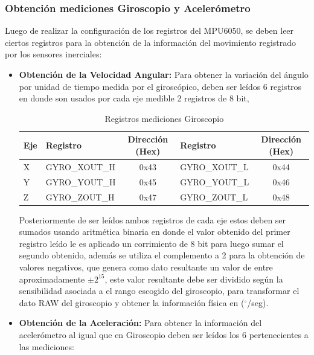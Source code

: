 \documentclass[12pt,a4paper]{article}
\newcommand{\grad}{$^{\circ}$}
\begin{document}
\subsubsection{Obtención mediciones Giroscopio y Acelerómetro}
Luego de realizar la configuración de los registros del MPU6050, se deben leer ciertos registros para la obtención de la información del movimiento registrado por los sensores inerciales:

\begin{itemize}
	\item \textbf{Obtención de la Velocidad Angular:} Para obtener la variación del ángulo por unidad de tiempo medida por el giroscópico, deben ser leídos 6 registros en donde son usados por cada eje medible 2 registros de 8 bit,
	
	\begin{table}[H]
		\centering
		\label{table:registrosgyro}
		\begin{tabular}{|l|l|c|l|c|}
			\hline
			\textbf{Eje} & \textbf{Registro} & \textbf{Dirección (Hex)} & \textbf{Registro} & \textbf{Dirección (Hex)} \\ \hline
			X            & GYRO\_XOUT\_H     & 0x43                     & GYRO\_XOUT\_L     & 0x44                     \\ \hline
			Y            & GYRO\_YOUT\_H     & 0x45                     & GYRO\_YOUT\_L     & 0x46                     \\ \hline
			Z            & GYRO\_ZOUT\_H     & 0x47                     & GYRO\_ZOUT\_L     & 0x48                     \\ \hline
		\end{tabular}
		\caption{Registros mediciones Giroscopio}					
	\end{table}
	
	Posteriormente de ser leídos ambos registros de cada eje estos deben ser sumados usando aritmética binaria en donde el valor obtenido del primer registro leído le es aplicado un corrimiento de 8 bit para luego sumar el segundo obtenido, además se utiliza el complemento a 2 para la obtención de valores negativos, que genera como dato resultante un valor de entre aproximadamente $\pm 2^{15}$, este valor resultante debe ser dividido según la sensibilidad asociada a el rango escogido del giroscopio, para transformar el dato RAW del giroscopio y obtener la información física en (\grad/seg).
	
	\item \textbf{Obtención de la Aceleración:} Para obtener la información del acelerómetro al igual que en Giroscopio deben ser leídos los 6 pertenecientes a las mediciones:
	

\end{itemize}
\end{document}
